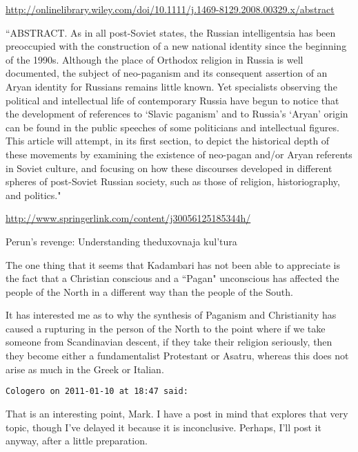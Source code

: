 \begin{footnotesize}
\begin{sffamily}
\url{http://onlinelibrary.wiley.com/doi/10.1111/j.1469-8129.2008.00329.x/abstract}

``ABSTRACT. As in all post-Soviet states, the Russian intelligentsia has been preoccupied with the construction of a new national identity since the beginning of the 1990s. Although the place of Orthodox religion in Russia is well documented, the subject of neo-paganism and its consequent assertion of an Aryan identity for Russians remains little known. Yet specialists observing the political and intellectual life of contemporary Russia have begun to notice that the development of references to `Slavic paganism' and to Russia's `Aryan' origin can be found in the public speeches of some politicians and intellectual figures. This article will attempt, in its first section, to depict the historical depth of these movements by examining the existence of neo-pagan and/or Aryan referents in Soviet culture, and focusing on how these discourses developed in different spheres of post-Soviet Russian society, such as those of religion, historiography, and politics."

\url{http://www.springerlink.com/content/j30056125185344h/}

Perun's revenge: Understanding theduxovnaja kul'tura

The one thing that it seems that Kadambari has not been able to appreciate is the fact that a Christian conscious and a ``Pagan" unconscious has affected the people of the North in a different way than the people of the South.

It has interested me as to why the synthesis of Paganism and Christianity has caused a rupturing in the person of the North to the point where if we take someone from Scandinavian descent, if they take their religion seriously, then they become either a fundamentalist Protestant or Asatru, whereas this does not arise as much in the Greek or Italian.


\hfill

\texttt{Cologero on 2011-01-10 at 18:47 said: }

That is an interesting point, Mark. I have a post in mind that explores that very topic, though I've delayed it because it is inconclusive. Perhaps, I'll post it anyway, after a little preparation.


\hfill


\end{sffamily}\end{footnotesize}
